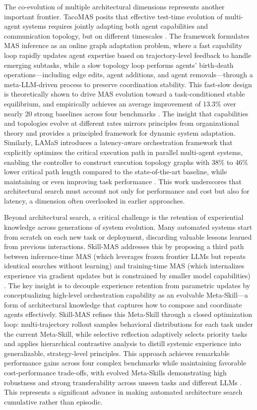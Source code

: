 \documentclass[11pt]{article}
\begin{document}
The co-evolution of multiple architectural dimensions represents another important frontier. TacoMAS posits that effective test-time evolution of multi-agent systems requires jointly adapting both agent capabilities and communication topology, but on different timescales \cite{ref271}. The framework formulates MAS inference as an online graph adaptation problem, where a fast capability loop rapidly updates agent expertise based on trajectory-level feedback to handle emerging subtasks, while a slow topology loop performs agents' birth-death operations---including edge edits, agent additions, and agent removals---through a meta-LLM-driven process to preserve coordination stability. This fast-slow design is theoretically shown to drive MAS evolution toward a task-conditioned stable equilibrium, and empirically achieves an average improvement of 13.3\% over nearly 20 strong baselines across four benchmarks \cite{ref271}. The insight that capabilities and topologies evolve at different rates mirrors principles from organizational theory and provides a principled framework for dynamic system adaptation. Similarly, LAMaS introduces a latency-aware orchestration framework that explicitly optimizes the critical execution path in parallel multi-agent systems, enabling the controller to construct execution topology graphs with 38\% to 46\% lower critical path length compared to the state-of-the-art baseline, while maintaining or even improving task performance \cite{ref272}. This work underscores that architectural search must account not only for performance and cost but also for latency, a dimension often overlooked in earlier approaches.

Beyond architectural search, a critical challenge is the retention of experiential knowledge across generations of system evolution. Many automated systems start from scratch on each new task or deployment, discarding valuable lessons learned from previous interactions. Skill-MAS addresses this by proposing a third path between inference-time MAS (which leverages frozen frontier LLMs but repeats identical searches without learning) and training-time MAS (which internalizes experience via gradient updates but is constrained by smaller model capabilities) \cite{ref143}. The key insight is to decouple experience retention from parametric updates by conceptualizing high-level orchestration capability as an evolvable Meta-Skill---a form of architectural knowledge that captures how to compose and coordinate agents effectively. Skill-MAS refines this Meta-Skill through a closed optimization loop: multi-trajectory rollout samples behavioral distributions for each task under the current Meta-Skill, while selective reflection adaptively selects priority tasks and applies hierarchical contrastive analysis to distill systemic experience into generalizable, strategy-level principles. This approach achieves remarkable performance gains across four complex benchmarks while maintaining favorable cost-performance trade-offs, with evolved Meta-Skills demonstrating high robustness and strong transferability across unseen tasks and different LLMs \cite{ref143}. This represents a significant advance in making automated architecture search cumulative rather than episodic.
\end{document}
